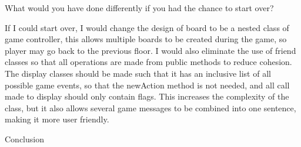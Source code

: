 \documentclass[11pt]{article}
\theoremstyle{plain} \newtheorem{theorem*}{Theorem}[subsection]
\begin{document}
What would you have done differently if you had the chance to start over? 

If I could start over, I would change the design of board to be a nested class
of game controller, this allows multiple boards to be created during the game,
so player may go back to the previous floor. I would also eliminate the use of
friend classes so that all operations are made from public methods to reduce
cohesion. The display classes should be made such that it has an inclusive list
of all possible game events, so that the newAction method is not needed, and
all call made to display should only contain flags. This increases the
complexity of the class, but it also allows several game messages to be
combined into one sentence, making it more user friendly.  

Conclusion 
\end{document}
